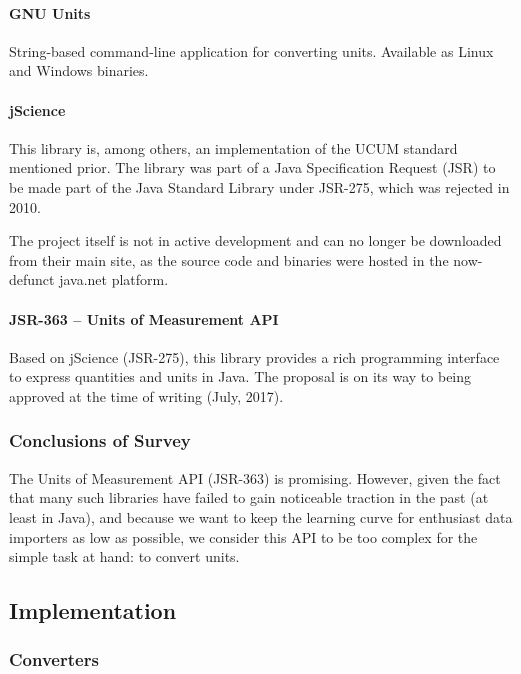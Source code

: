 \paragraph{GNU Units}\label{gnu-units}

String-based command-line application for converting units. Available as
Linux and Windows binaries.

\paragraph{jScience}\label{jscience}

This library is, among others, an implementation of the UCUM standard
mentioned prior. The library was part of a Java Specification Request
(JSR) to be made part of the Java Standard Library under JSR-275, which
was rejected in 2010.

The project itself is not in active development and can no longer be
downloaded from their main site, as the source code and binaries were
hosted in the now-defunct java.net platform.

\paragraph{JSR-363 -- Units of Measurement
API}\label{jsr-363-units-of-measurement-api}

Based on jScience (JSR-275), this library provides a rich programming
interface to express quantities and units in Java. The proposal is on
its way to being approved at the time of writing (July, 2017).

\subsubsection{Conclusions of Survey}\label{conclusions-of-survey}

The Units of Measurement API (JSR-363) is promising. However, given the
fact that many such libraries have failed to gain noticeable traction in
the past (at least in Java), and because we want to keep the learning
curve for enthusiast data importers as low as possible, we consider this
API to be too complex for the simple task at hand: to convert units.

\subsection{Implementation}\label{implementation}

\subsubsection{Converters}\label{converters}

